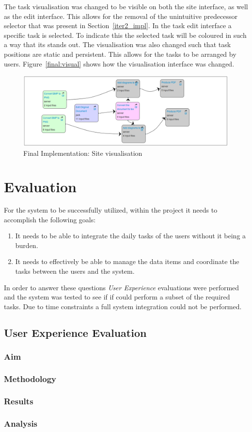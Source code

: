 \documentclass[12pt,a4paper]{report}
\begin{document}
The task visualisation was changed to be visible on both the site interface, as well as the 
edit interface. This allows for the removal of the unintuitive predecessor selector that
was present in Section~\ref{iter2_impl}. In the task edit interface a
specific task is selected. To indicate this the selected task will be 
coloured in such a way that its stands out. The visualisation was also
changed such that task positions are static and persistent. This allows
for the tasks to be arranged by users. Figure~\ref{final:visual} shows
how the visualisation interface was changed.


\begin{figure}[!h]
    \begin{center}
        \includegraphics[scale=0.45]{figures/final-visual.png}
    \end{center}
    \caption{Final Implementation: Site visualisation}
    \label{final:tree_view}
\end{figure}

\chapter{Evaluation}

For the system to be successfully utilized, within the project
it needs to accomplish the following goals: 
\begin{enumerate}
\item It needs to be able to integrate the daily tasks of the users
      without it being a burden. 
\item It needs to effectively be able to manage the data items and
      coordinate the tasks between the users and the system. 
\end{enumerate}

In order to answer these questions \emph{User Experience} evaluations
were performed and the system was tested to see if if could perform
a subset of the required tasks. Due to time constraints a full 
system integration could not be performed. 

\section{User Experience Evaluation}
\subsection{Aim}
\subsection{Methodology}
\subsection{Results}
\subsection{Analysis}


{}

\end{document}
